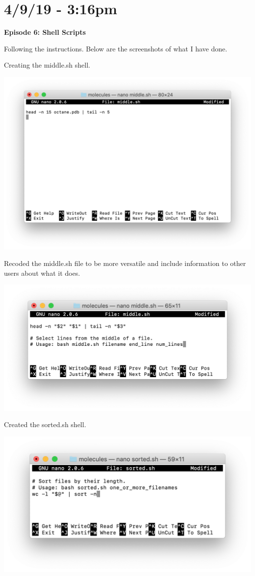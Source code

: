 \documentclass{article}
\begin{document}
\section*{4/9/19 - 3:16pm}

\textbf{Episode 6: Shell Scripts}

Following the instructions. Below are the screenshots of what I have done.

Creating the middle.sh shell.

\includegraphics[width=\textwidth]{figu.png}

Recoded the middle.sh file to be more versatile and include information to other users about what it does.

\includegraphics[width=\textwidth]{figv.png}

Created the sorted.sh shell.

\includegraphics[width=\textwidth]{figw.png}
\end{document}
